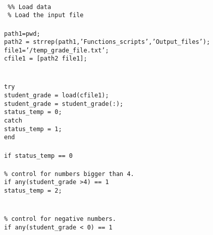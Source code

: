  \begin{mdframed}[hidealllines=true,backgroundcolor=gray!20]
 \begin{singlespace}
 \fontsize{10pt}{1pt}
 \texttt{
\\
{ \color{matlab_green}\%\% Load data}\\
{ \color{matlab_green}\% Load the input file}\\
\\
path1=pwd;\\
path2 = strrep(path1,'Functions\_scripts','Output\_files'); \\
file1='/temp\_grade\_file.txt';\\
cfile1 = [path2 file1];\\
\\
\\
{\color{for_blue}try}\\
\phantom{x}\hspace{5ex} student\_grade = load(cfile1);\\
\phantom{x}\hspace{5ex} student\_grade = student\_grade(:);\\
\phantom{x}\hspace{5ex} status\_temp = 0;\\
{\color{for_blue}catch}\\
\phantom{x}\hspace{5ex} status\_temp = 1;\\
{\color{for_blue}end}\\
\\
{\color{for_blue}if} status\_temp == 0\\
\\
\noindent    
\phantom{x}\hspace{5ex} {\color{matlab_green}\% control for numbers bigger than 4.}\\
\phantom{x}\hspace{5ex} {\color{for_blue}if} any(student\_grade >4) == 1\\ 
\phantom{x}\hspace{10ex} status\_temp = 2;\\
\phantom{x}\\
\\ 
\noindent
\phantom{x}\hspace{5ex} {\color{matlab_green}\% control for negative numbers.}\\
\phantom{x}\hspace{5ex} {\color{for_blue}if} any(student\_grade < 0) == 1\\ 
}
\end{singlespace}
\end{mdframed}

